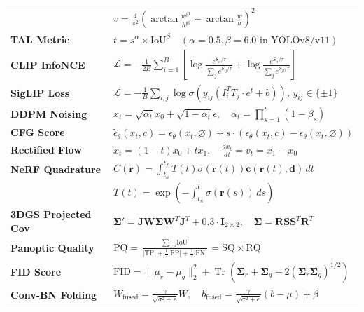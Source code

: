 \begin{tabularx}{\linewidth}{@{}p{23mm} X@{}}
& $v = \frac{4}{\pi^2}\left(\arctan\frac{w^{\text{gt}}}{h^{\text{gt}}} - \arctan\frac{w}{h}\right)^2$\\
\textbf{TAL Metric} & $t = s^\alpha \times \text{IoU}^\beta \quad (\alpha=0.5, \beta=6.0\text{ in YOLOv8/v11})$\\
\textbf{CLIP InfoNCE} & $\mathcal{L} = -\frac{1}{2B}\sum_{i=1}^B \left[ \log\frac{e^{S_{ii}/\tau}}{\sum_j e^{S_{ij}/\tau}} + \log\frac{e^{S_{ii}/\tau}}{\sum_j e^{S_{ji}/\tau}} \right]$\\
\textbf{SigLIP Loss} & $\mathcal{L} = -\frac{1}{B}\sum_{i,j} \log \sigma\left( y_{ij} (I_i^T T_j \cdot e^t + b) \right), \, y_{ij} \in \{\pm 1\}$\\
\textbf{DDPM Noising} & $x_t = \sqrt{\bar{\alpha}_t} x_0 + \sqrt{1 - \bar{\alpha}_t} \epsilon, \quad \bar{\alpha}_t = \prod_{s=1}^t (1 - \beta_s)$\\
\textbf{CFG Score} & $\tilde{\epsilon}_\theta(x_t, c) = \epsilon_\theta(x_t, \varnothing) + s \cdot (\epsilon_\theta(x_t, c) - \epsilon_\theta(x_t, \varnothing))$\\
\textbf{Rectified Flow} & $x_t = (1 - t) x_0 + t x_1, \quad \frac{d x_t}{dt} = v_t = x_1 - x_0$\\
\textbf{NeRF Quadrature} & $C(\mathbf{r}) = \int_{t_n}^{t_f} T(t) \sigma(\mathbf{r}(t)) \mathbf{c}(\mathbf{r}(t), \mathbf{d})\, dt$\\[1pt]
& $T(t) = \exp\left(-\int_{t_n}^t \sigma(\mathbf{r}(s))\, ds\right)$\\
\textbf{3DGS Projected Cov} & $\mathbf{\Sigma}' = \mathbf{J} \mathbf{W} \mathbf{\Sigma} \mathbf{W}^T \mathbf{J}^T + 0.3 \cdot \mathbf{I}_{2 \times 2}, \quad \mathbf{\Sigma} = \mathbf{R} \mathbf{S} \mathbf{S}^T \mathbf{R}^T$\\
\textbf{Panoptic Quality} & $\text{PQ} = \frac{\sum_{\text{TP}} \text{IoU}}{|\text{TP}| + \frac{1}{2}|\text{FP}| + \frac{1}{2}|\text{FN}|} = \text{SQ} \times \text{RQ}$\\
\textbf{FID Score} & $\text{FID} = \|\mu_r - \mu_g\|_2^2 + \operatorname{Tr}\left( \mathbf{\Sigma}_r + \mathbf{\Sigma}_g - 2(\mathbf{\Sigma}_r \mathbf{\Sigma}_g)^{1/2} \right)$\\
\textbf{Conv-BN Folding} & $W_{\text{fused}} = \frac{\gamma}{\sqrt{\sigma^2 + \epsilon}} W, \quad b_{\text{fused}} = \frac{\gamma}{\sqrt{\sigma^2 + \epsilon}} (b - \mu) + \beta$\\
\bottomrule
\end{tabularx}
